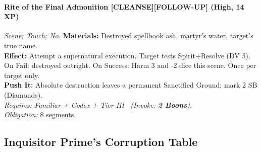 \paragraph{Rite of the Final Admonition \textnormal{[CLEANSE][FOLLOW-UP]} (High, 14 XP)} \emph{Scene; Touch; No.}
\textbf{Materials:} Destroyed spellbook ash, martyr's water, target's true name.\\
\textbf{Effect:} Attempt a supernatural execution. Target tests Spirit+Resolve (DV 5). On Fail: destroyed outright. On Success: Harm 3 and -2 dice this scene. Once per target only.\\
\textbf{Push It:} Absolute destruction leaves a permanent Sanctified Ground; mark 2 SB (Diamonds).\\
\emph{Requires: Familiar + Codex + Tier III \ (\textit{Invoke:} \textbf{2 Boons}).}\\
\emph{Obligation:} 8 segments.

\subsection*{Inquisitor Prime's Corruption Table}
\label{sec:inquisitor-prime-corruption}

